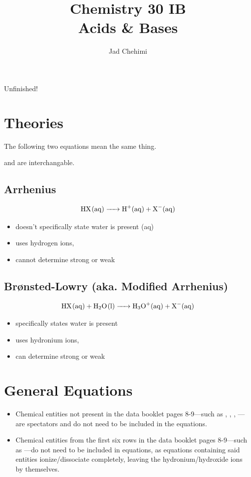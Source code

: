 \documentclass[a4paper,12pt]{article}
\title{Chemistry 30 IB \\ Acids \& Bases}
\author{Jad Chehimi}
\begin{document}
\maketitle

\begin{center}
\Huge
Unfinished!
\normalsize
\end{center}

\tableofcontents

\pagebreak

\section{Theories}
The following two equations mean the same thing.

 and  are interchangable.

\subsection{Arrhenius}
\Large
$$\ce{HX(aq) -> H+(aq) + X-(aq)}$$
\normalsize
\begin{itemize}
    \item{doesn't specifically state water is present (aq)}
    \item{uses hydrogen ions, }
    \item{cannot determine strong or weak}
\end{itemize}

\subsection{Br{\o}nsted-Lowry (aka. Modified Arrhenius)}
\Large
$$\ce{HX(aq) + H2O(l) -> H3O+(aq) + X-(aq)}$$
\normalsize
\begin{itemize}
    \item{specifically states water is present}
    \item{uses hydronium ions, }
    \item{can determine strong or weak}
\end{itemize}

\section{General Equations}

\begin{itemize}
    \item{Chemical entities not present in the data booklet pages 8-9---such as , , , ---are spectators and do not need to be included in the equations.}
    \item{Chemical entities from the first six rows in the data booklet pages 8-9---such as ---do not need to be included in equations, as equations containing said entities ionize/dissociate completely, leaving the hydronium/hydroxide ions by themselves.}
\end{itemize}
\end{document}
